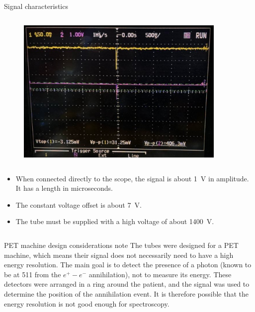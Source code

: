 \begin{columnframe}{Signal characteristics}
    \begin{column}{0.5\textwidth}
        \begin{figure}
            \centering
            \includegraphics[width=0.9\textwidth]{images/scope_screenshot.png}
        \end{figure}
    \end{column}
    \begin{column}{0.5\textwidth}
        \begin{itemize}
            \item When connected directly to the scope, the signal is about \SI{1}{\volt} in amplitude. It has a length in microseconds.
            \item The constant voltage offset is about \SI{7}{\volt}.
            \item The tube must be supplied with a high voltage of about \SI{1400}{\volt}.
        \end{itemize}
    \end{column}
\end{columnframe}

\begin{frame}{PET machine design considerations note}
    The tubes were designed for a PET machine, which means their signal does not necessarily need to have a high energy resolution. The main goal is to detect the presence of a photon (known to be at 511 \keV from the $e^+ - e^-$ annihilation), not to measure its energy. These detectors were arranged in a ring around the patient, and the signal was used to determine the position of the annihilation event. It is therefore possible that the energy resolution is not good enough for spectroscopy.
\end{frame}

